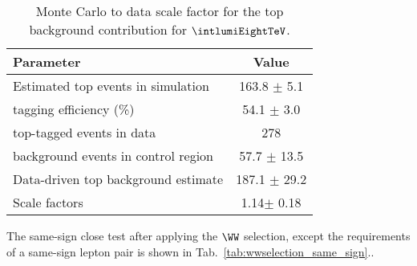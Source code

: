 \begin{table}[ht!]
\begin{center} 
\begin{tabular}{l c}
\hline
                             Parameter      & Value             \\
\hline
       Estimated top events in simulation   & 163.8  $\pm$ 5.1   \\
                   tagging efficiency (\%)  & 54.1 $\pm$  3.0   \\
                top-tagged events in data   & 278 \\ 
      background events in control region   & 57.7 $\pm$ 13.5  \\
      Data-driven top background estimate   & 187.1 $\pm$ 29.2  \\
                            Scale factors   & 1.14$\pm$ 0.18 \\
\hline
\end{tabular}  
\caption{\fixme Monte Carlo to data scale factor for the top background contribution for $\intlumiEightTeV$.}  
\label{tab:top_wwsec}
\end{center}
\end{table}

The same-sign close test after applying the $\WW$ selection, except the requirements of a same-sign 
 lepton pair is shown in Tab.~\ref{tab:wwselection_same_sign}..
 
